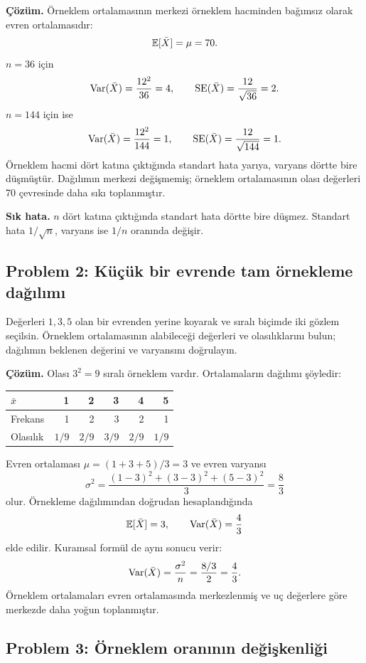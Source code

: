 \textbf{Çözüm.} Örneklem ortalamasının merkezi örneklem hacminden bağımsız
olarak evren ortalamasıdır:
\[
\mathbb{E}[\bar X]=\mu=70.
\]
$n=36$ için
\[
\operatorname{Var}(\bar X)=\frac{12^2}{36}=4,
\qquad \operatorname{SE}(\bar X)=\frac{12}{\sqrt{36}}=2.
\]
$n=144$ için ise
\[
\operatorname{Var}(\bar X)=\frac{12^2}{144}=1,
\qquad \operatorname{SE}(\bar X)=\frac{12}{\sqrt{144}}=1.
\]
Örneklem hacmi dört katına çıktığında standart hata yarıya, varyans dörtte
bire düşmüştür. Dağılımın merkezi değişmemiş; örneklem ortalamasının olası
değerleri 70 çevresinde daha sıkı toplanmıştır.

\textbf{Sık hata.} $n$ dört katına çıktığında standart hata dörtte bire
düşmez. Standart hata $1/\sqrt n$, varyans ise $1/n$ oranında değişir.

\subsection*{Problem 2: Küçük bir evrende tam örnekleme dağılımı}

Değerleri $1,3,5$ olan bir evrenden yerine koyarak ve sıralı biçimde iki
gözlem seçilsin. Örneklem ortalamasının alabileceği değerleri ve olasılıklarını
bulun; dağılımın beklenen değerini ve varyansını doğrulayın.

\textbf{Çözüm.} Olası $3^2=9$ sıralı örneklem vardır. Ortalamaların dağılımı
şöyledir:

\begin{center}
\begin{tabular}{lrrrrr}
\toprule
$\bar x$ & 1 & 2 & 3 & 4 & 5 \\
\midrule
Frekans & 1 & 2 & 3 & 2 & 1 \\
Olasılık & $1/9$ & $2/9$ & $3/9$ & $2/9$ & $1/9$ \\
\bottomrule
\end{tabular}
\end{center}

Evren ortalaması $\mu=(1+3+5)/3=3$ ve evren varyansı
\[
\sigma^2=\frac{(1-3)^2+(3-3)^2+(5-3)^2}{3}=\frac{8}{3}
\]
olur. Örnekleme dağılımından doğrudan hesaplandığında
\[
\mathbb{E}[\bar X]=3,
\qquad \operatorname{Var}(\bar X)=\frac{4}{3}
\]
elde edilir. Kuramsal formül de aynı sonucu verir:
\[
\operatorname{Var}(\bar X)=\frac{\sigma^2}{n}
=\frac{8/3}{2}=\frac{4}{3}.
\]
Örneklem ortalamaları evren ortalamasında merkezlenmiş ve uç değerlere göre
merkezde daha yoğun toplanmıştır.

\subsection*{Problem 3: Örneklem oranının değişkenliği}

